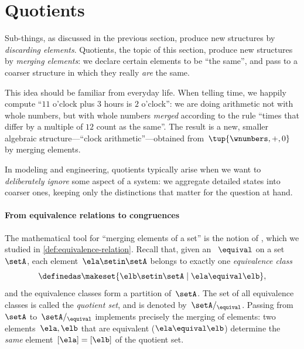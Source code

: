 
\section{Quotients}
\label{sec:quotients-algebra}

Sub-things, as discussed in the previous section, produce new structures by \emph{discarding elements}.
Quotients, the topic of this section, produce new structures by \emph{merging elements}: we declare certain elements to be ``the same'', and pass to a coarser structure in which they really \emph{are} the same.

This idea should be familiar from everyday life.
When telling time, we happily compute ``$11$ o'clock plus $3$ hours is $2$ o'clock'': we are doing arithmetic not with whole numbers, but with whole numbers \emph{merged} according to the rule ``times that differ by a multiple of $12$ count as the same''.
The result is a new, smaller algebraic structure---``clock arithmetic''---obtained from~$\tup{\wnumbers, +, 0}$ by merging elements.

In modeling and engineering, quotients typically arise when we want to \emph{deliberately ignore} some aspect of a system: we aggregate detailed states into coarser ones, keeping only the distinctions that matter for the question at hand.

\paragraph{From equivalence relations to congruences}

The mathematical tool for ``merging elements of a set'' is the notion of , which we studied in \cref{def:equivalence-relation}.
Recall that, given an ~$\equival$ on a set~$\setA$, each element~$\ela \setin \setA$ belongs to exactly one \emph{equivalence class}
\begin{equation}
    [\ela] \definedas \makeset{ \elb \setin \setA \mid \ela \equival \elb },
\end{equation}
and the equivalence classes form a partition of~$\setA$.
The set of all equivalence classes is called the \emph{quotient set}, and is denoted by~$\setA/_{\equival}$.
Passing from~$\setA$ to~$\setA/_{\equival}$ implements precisely the merging of elements: two elements~$\ela, \elb$ that are equivalent ($\ela \equival \elb$) determine the \emph{same} element~$[\ela] = [\elb]$ of the quotient set.

